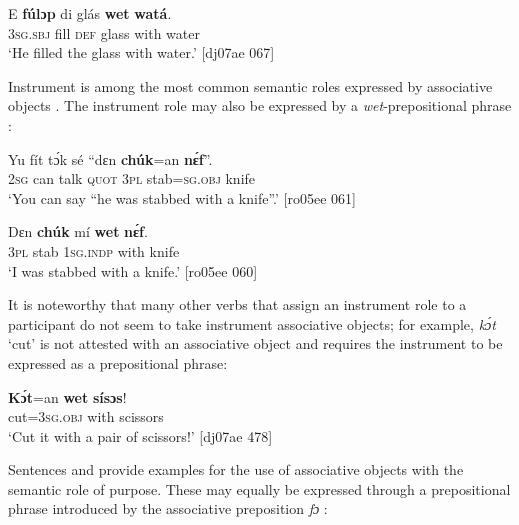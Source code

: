 \ea%
    \label{ex:key:1176}
    \gll E    \textbf{fúlɔp}  di  glás    \textbf{wet}    \textbf{watá}.\\
\textsc{3sg.sbj}  fill    \textsc{def}  glass  with    water\\

\glt ‘He filled the glass with water.’ [dj07ae 067]
\z

Instrument is among the most common semantic roles expressed by associative objects . The instrument role may also be expressed by a \textit{wet}{}-prepositional phrase :


\ea%
    \label{ex:key:1177}
    \gll Yu  fít  tɔ́k  sé   “dɛn    \textbf{chúk}=an    \textbf{nɛ́f}”.\\
\textsc{2sg}  can  talk  \textsc{quot}    \phantom{‘}\textsc{3pl}    {stab=\textsc{sg}.\textsc{obj}}  knife\\

\glt ‘You can say “he was stabbed with a knife”.’ [ro05ee 061]
\z


\ea%
    \label{ex:key:1178}
    \gll Dɛn  \textbf{chúk}  mí    \textbf{wet}    \textbf{nɛ́f}.\\
\textsc{3pl}  stab    \textsc{1sg.indp}  with    knife\\

\glt ‘I was stabbed with a knife.’ [ro05ee 060]
\z

\newpage 
It is noteworthy that many other verbs that assign an instrument role to a participant do not seem to take instrument associative objects; for example, \textit{kɔ́t} ‘cut’ is not attested with an associative object and requires the instrument to be expressed as a prepositional phrase: 


\z


\ea%
    \label{ex:key:1180}
    \gll \textbf{Kɔ́t}=an    \textbf{wet}    \textbf{sísɔs}!\\
cut=\textsc{3sg.obj}  with    scissors\\

\glt ‘Cut it with a pair of scissors!’ [dj07ae 478]
\z

Sentences  and  provide examples for the use of associative objects with the semantic role of purpose. These may equally be expressed through a prepositional phrase introduced by the associative preposition \textit{fɔ} : 



